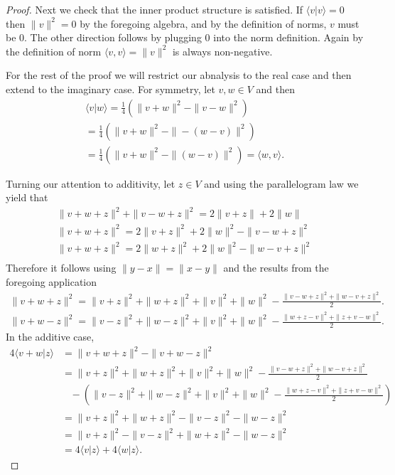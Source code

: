 \documentclass[11pt]{amsart}
\theoremstyle{definition}
\numberwithin{theorem}{section}
\numberwithin{definition}{section}
\numberwithin{equation}{section}
\begin{document}
{{{\begin{proof}
	Next we check that the inner product structure is satisfied. If $\langle v | v \rangle = 0$ then $\|v\|^2 = 0$ by the foregoing algebra, and by the definition of norms, $v$ must be $0$. The other direction follows by plugging $0$ into the norm definition. Again by the definition of norm $\langle v, v\rangle = \|v\|^2$ is always non-negative.

	For the rest of the proof we will restrict our abnalysis to the real case and then extend to the imaginary case. For symmetry, let $v, w \in V$ and then
	\begin{equation*}
	\begin{aligned}
		\langle v |w\rangle = \frac{1}{4}\left(\|v + w\|^2 - \|v -w\|^2\right) \\
		 = \frac{1}{4}\left(\|v+ w\|^2 - \|-(w -v)\|^2\right) \\
		  = \frac{1}{4}\left(\|v+ w\|^2 - \|(w -v)\|^2\right)  = \langle w, v \rangle.
	\end{aligned}
	\end{equation*}

	Turning our attention to additivity, let $z \in V$ and using the parallelogram law we yield that 
	\begin{equation*}
	\begin{aligned}
		\|v + w + z\|^2 + \|v- w + z \|^2 = 2\|v +z\| + 2 \|w\| \\ 
		\|v + w + z \|^2 = 2 \|v + z\|^2 + 2\|w\|^2 - \|v -w + z\|^2 \\
		\|v + w + z \|^2 = 2 \|w + z\|^2 + 2\|w\|^2 - \|w-v + z\|^2 \\
	\end{aligned}
	\end{equation*}
	Therefore it follows using $\|y-x\| = \|x-y\|$ and the results from the foregoing application
	\begin{equation*}
	\begin{aligned}
		\|v + w + z\|^2 = \|v + z\|^2 + \|w + z\|^2 + \|v\|^2 + \|w\|^2  - \frac{\|v - w + z\|^2 + \|w- v + z\|^2}{2}. \\
		\|v + w - z\|^2 = \|v - z\|^2 + \|w - z\|^2+  \|v\|^2 + \|w\|^2  - \frac{\| w + z -v\|^2 + \| z + v - w\|^2}{2}.
	\end{aligned}
	\end{equation*}
	In the additive case,
	\begin{equation*}
		\begin{aligned}
			4\langle v + w| z \rangle &=  \|v + w+ z\|^2 - \|v + w -z\|^2 \\
			&=   \|v + z\|^2 + \|w + z\|^2 + \|v\|^2 + \|w\|^2  - \frac{\|v - w + z\|^2 + \|w- v + z\|^2}{2}\\
			&\;\;\;- \left(\|v - z\|^2 + \|w - z\|^2+  \|v\|^2 + \|w\|^2  - \frac{\| w + z -v\|^2 + \| z + v - w\|^2}{2}\right) \\
			&=   \|v + z\|^2 + \|w + z\|^2  - \|v - z\|^2 - \|w - z\|^2\\
			&=   \|v + z\|^2 - \|v - z\|^2 + \|w + z\|^2  - \|w - z\|^2 \\
			&= 4\langle v| z\rangle + 4 \langle w| z \rangle.
		\end{aligned}
	\end{equation*}


\end{proof}}}}
\end{document}
